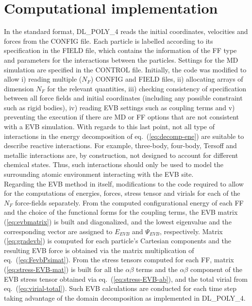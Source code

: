 \section{Computational implementation}\label{sec:implement}
In the standard format, DL\_POLY\_4 reads the initial coordinates, velocities and forces from the CONFIG file. Each particle is labelled according to its specification in the FIELD file, which contains the information of the FF type and parameters for the interactions between the particles. Settings for the MD simulation are specified in the CONTROL file. Initially, the code was modified to allow i) reading multiple ($N_F$) CONFIG and FIELD files, ii) allocating arrays of dimension $N_F$ for the relevant quantities, iii) checking consistency of specification between all force fields and initial coordinates (including any possible constraint such as rigid bodies), iv) reading EVB settings such as coupling terms and v) preventing the execution if there are MD or FF options that are not consistent with a EVB simulation. With regards to this last point, not all type of interactions in the energy decomposition of eq.~(\ref{eq:decomp-ene}) are suitable to describe reactive interactions. For example, three-body, four-body, Tersoff and metallic interactions are, by construction, not designed to account for different chemical states. Thus, such interactions should only be used to model the surrounding atomic environment interacting with the EVB site.\\
Regarding the EVB method in itself, modifications to the code required to allow for the computations of energies, forces, stress tensor and virials for each of the $N_F$ force-fields separately. From the computed configurational energy of each FF and the choice of the functional forms for the coupling terms, the EVB matrix (\ref{eq:evbmatrix}) is built and diagonalized, and the lowest eigenvalue and the corresponding vector are assigned to $E_{EVB}$ and $\Psi_{EVB}$, respectively. Matrix (\ref{eq:gradevb}) is computed for each particle's Cartesian components and the resulting EVB force is obtained via the matrix multiplication of eq.~(\ref{eq:FevbPsimat}). From the stress tensors computed for each FF,  matrix (\ref{eq:stress-EVB-mat}) is built for all the $\alpha\beta$ terms and the $\alpha\beta$ component of the EVB stress tensor obtained via eq.~(\ref{eq:stress-EVB-ab}), and the total virial from eq.~(\ref{eq:virial-total}). Such EVB calculations are conducted for each time step taking advantage of the domain decomposition as implemented in DL\_POLY\_4.\\ 
